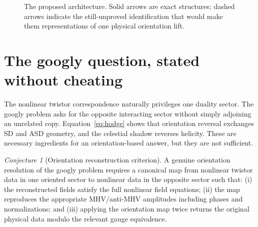 \documentclass[11pt]{article}
\theoremstyle{definition}\newtheorem{definition}[theorem]{Definition}
\theoremstyle{remark}\newtheorem{remark}[theorem]{Remark}\newtheorem{conjecture}[theorem]{Conjecture}
\begin{document}
\begin{figure}[t]
\centering
{}
\caption{The proposed architecture. Solid arrows are exact structures; dashed arrows indicate the still-unproved identification that would make them representations of one physical orientation lift.}
\label{fig:master}
\end{figure}

\section{The googly question, stated without cheating}
The nonlinear twistor correspondence naturally privileges one duality sector. The googly problem asks for the opposite interacting sector without simply adjoining an unrelated copy. Equation~\eqref{eq:hodge} shows that orientation reversal exchanges SD and ASD geometry, and the celestial shadow reverses helicity. These are necessary ingredients for an orientation-based answer, but they are not sufficient.

\begin{conjecture}[Orientation reconstruction criterion]\label{conj:googly}
A genuine orientation resolution of the googly problem requires a canonical map from nonlinear twistor data in one oriented sector to nonlinear data in the opposite sector such that: (i) the reconstructed fields satisfy the full nonlinear field equations; (ii) the map reproduces the appropriate MHV/anti-MHV amplitudes including phases and normalizations; and (iii) applying the orientation map twice returns the original physical data modulo the relevant gauge equivalence.
\end{conjecture}
\end{document}
